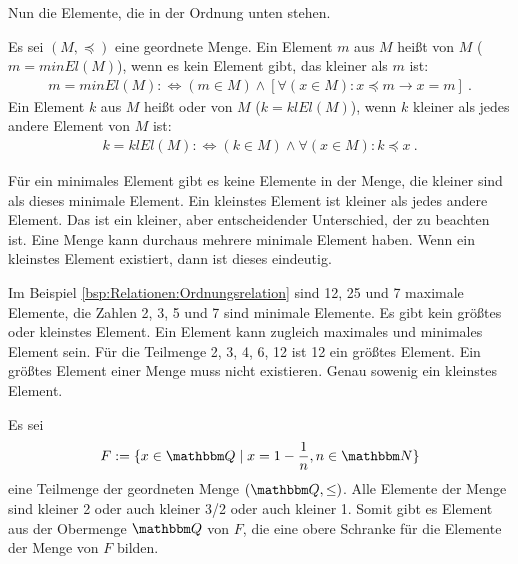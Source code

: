 \begin{Unit}
Nun die Elemente, die in der Ordnung unten stehen.
  
\begin{Definition}
  Es sei $(M,\preceq)$ eine geordnete Menge. Ein Element $m$ aus $M$ heißt 
   von $M$ ($m = 
  minEl(M)$), wenn es kein Element gibt, das kleiner als $m$ ist:
  \begin{align}
    m = minEl(M) :\Leftrightarrow (m \in M) \land [\forall (x \in M): 
    x \preceq m 
      \rightarrow x = m] \ .
  \end{align}
  Ein Element $k$ aus $M$ heißt  oder  von $M$ ($k = klEl(M)$), wenn $k$ 
  kleiner als jedes andere Element von $M$ ist:
  \begin{align}
    k = klEl(M) :\Leftrightarrow (k \in M) \land \forall(x \in M): 
    k \preceq x \ .
  \end{align}
\end{Definition}

Für ein minimales Element gibt es keine Elemente in der Menge, die kleiner 
sind als dieses minimale Element. Ein kleinstes Element ist kleiner als 
jedes andere Element. Das ist ein kleiner, aber entscheidender Unterschied, 
der zu beachten ist. Eine Menge kann durchaus mehrere minimale Element haben. 
Wenn ein kleinstes Element existiert, dann ist dieses eindeutig.
\end{Unit}

\begin{Unit}[Beispiel] 
  Im Beispiel \ref{bsp:Relationen:Ordnungsrelation} sind 12, 25 und 7 
  maximale Elemente, die Zahlen 2, 3, 5 und 7 sind minimale Elemente. Es gibt 
  kein größtes oder kleinstes Element. Ein Element kann zugleich maximales und
  minimales Element sein. Für die Teilmenge {2, 3, 4, 6, 12} ist 12 ein 
  größtes Element. Ein größtes Element einer Menge muss nicht existieren. Genau
  sowenig ein kleinstes Element.
\end{Unit}

\begin{Unit}[Beispiel]
  \label{bsp:Relationen:Wurzel2}
  Es sei
  \begin{align}
    F := \{x \in \QQ \mid x = 1 - \frac{1}{n}, n \in \NN \}
  \end{align}
  eine Teilmenge der geordneten Menge $(\QQ, \leq)$. Alle Elemente der Menge 
  sind kleiner 2 oder auch kleiner 3/2 oder auch kleiner 1. Somit gibt es 
  Element aus der Obermenge $\QQ$ von $F$, die eine obere Schranke für die 
  Elemente der Menge von $F$ bilden.
\end{Unit}


